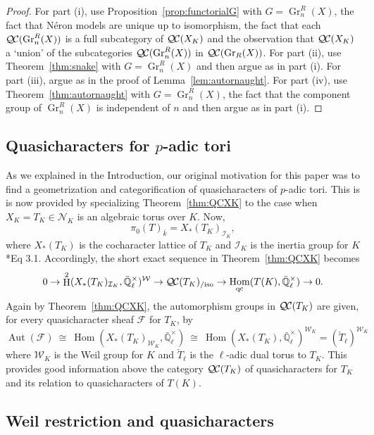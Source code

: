 \documentclass[CM,Submssn,SecEq]{degruyter-crelle} %
\theoremstyle{plain}
\theoremstyle{definition}
\theoremstyle{remark}
\newcommand{\EE}{\mathbb{\bar Q}_\ell}
\newcommand{\bFq}{\bar{k}}
\newcommand{\EEx}{\EE^\times}
\newcommand{\Weil}[1]{\mathcal{W}_{#1}}
\DeclareMathOperator{\Aut}{Aut}
\DeclareMathOperator{\Hom}{Hom}
\DeclareMathOperator{\Gr}{Gr}
\DeclareMathOperator{\Hh}{H}
\newcommand{\iso}{{\ \cong\ }}
\newcommand{\qcs}[1]{{\mathcal{#1}}}
\newcommand{\QC}{{\mathcal{Q\hskip-0.8pt C}}}
\newcommand{\QCiso}[1]{\QC(#1)_{/\text{iso}}}
\begin{document}
\begin{proof}
For part (i), use Proposition~\ref{prop:functorialG} with $G = \Gr^R_n(X)$, the fact that N\'eron models are unique up to isomorphism, the fact that each $\QC(\Gr^R_n(X))$ is a full subcategory of $\QC(X_K)$ and the observation that $\QC(X_K)$ a `union' of the subcategories $\QC(\Gr^R_n(X))$ in $\QC(\Gr_R(X))$.
For part (ii), use Theorem~\ref{thm:snake} with $G = \Gr^R_n(X)$ and then argue as in part (i).
For part (iii), argue as in the proof of Lemma~\ref{lem:autornaught}.
For part (iv), use Theorem~\ref{thm:autornaught} with $G = \Gr^R_n(X)$, the fact that the component group of $\Gr^R_n(X)$ is independent of $n$ and then argue as in part (i).
\end{proof}

\subsection{Quasicharacters for $p$-adic tori} \label{ssec:qc_tori}

As we explained in the Introduction, our original motivation for this paper was to find a geometrization and categorification of quasicharacters of $p$-adic tori. This is is now provided by specializing Theorem~\ref{thm:QCXK} to the case when $X_K= T_K\in \mathcal{N}_K$ is an algebraic torus over $K$. Now,
\[
 \pi_0(T)_{\bFq} = X_*(T_K)_{\mathcal{I}_K},
\]
where $X_*(T_K)$ is the cocharacter lattice of $T_K$ and $\mathcal{I}_K$ is the inertia group for $K$ \cite{bitan:discriminant}*{Eq 3.1}. 
Accordingly, the short exact sequence in Theorem~\ref{thm:QCXK} becomes
\begin{equation}
0 \to \Hh^2(X_*(T_K)_{\mathcal{I}_K},\EEx)^{\Weil{}} \to \QCiso{T_K} \to \Hom_\text{qc}(T(K),\EEx) \to 0.
\end{equation}
Again by Theorem~\ref{thm:QCXK}, the automorphism groups in $\QC(T_K)$ are given, for every quasicharacter sheaf $\qcs{F}$ for $T_K$, by
\begin{equation}
\Aut(\qcs{F}) \iso \Hom(X_*(T_K)_{\Weil{K}},\EEx) \iso \Hom(X_*(T_K),\EEx)^{\Weil{K}} = (\check{T}_\ell)^{\Weil{K}}
\end{equation}
where $\Weil{K}$ is the Weil group for $K$ and $\check{T}_\ell$ is the $\ell$-adic dual torus to $T_K$.
This provides good information above the category $\QC(T_K)$ of quasicharacters for $T_K$ and its relation to quasicharacters of $T(K)$. 

\subsection{Weil restriction and quasicharacters}\label{ssec:wrK}
\end{document}
